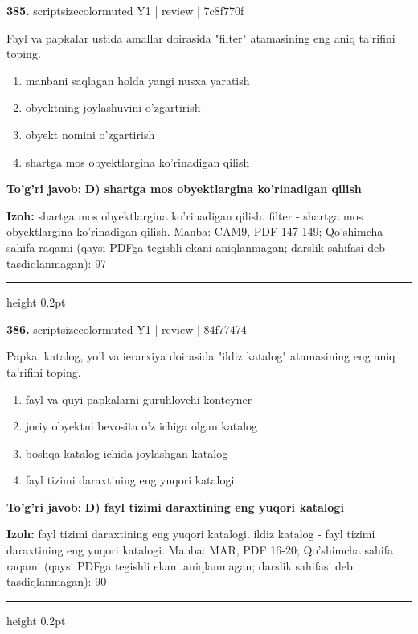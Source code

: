 \documentclass[10pt,a4paper]{article}
\begin{document}
{\bfseries\sffamily\color{ink} 385.} {scriptsizecolor{muted} Y1 | review | 7c8f770f}
\par
Fayl va papkalar ustida amallar doirasida "filter" atamasining eng aniq ta'rifini toping.
\begin{enumerate}[label=\Alph*),leftmargin=9mm]
\item manbani saqlagan holda yangi nusxa yaratish
\item obyektning joylashuvini o'zgartirish
\item obyekt nomini o'zgartirish
\item shartga mos obyektlargina ko'rinadigan qilish
\end{enumerate}
\begin{tcolorbox}[enhanced,breakable,colback=teal!4,colframe=teal!60!black,boxrule=0.45pt,arc=1.2mm,left=2.7mm,right=2.7mm,top=1.8mm,bottom=1.8mm,before skip=2mm,after skip=2mm]
{\bfseries\sffamily\color{teal}To'g'ri javob:} \textbf{D) shartga mos obyektlargina ko'rinadigan qilish}
\par\smallskip
{\bfseries Izoh:} shartga mos obyektlargina ko'rinadigan qilish. filter - shartga mos obyektlargina ko'rinadigan qilish. Manba: CAM9, PDF 147-149; Qo'shimcha sahifa raqami (qaysi PDFga tegishli ekani aniqlanmagan; darslik sahifasi deb tasdiqlanmagan): 97
\end{tcolorbox}
\vspace{2mm}\hrule height 0.2pt\vspace{3mm}

{\bfseries\sffamily\color{ink} 386.} {scriptsizecolor{muted} Y1 | review | 84f77474}
\par
Papka, katalog, yo'l va ierarxiya doirasida "ildiz katalog" atamasining eng aniq ta'rifini toping.
\begin{enumerate}[label=\Alph*),leftmargin=9mm]
\item fayl va quyi papkalarni guruhlovchi konteyner
\item joriy obyektni bevosita o'z ichiga olgan katalog
\item boshqa katalog ichida joylashgan katalog
\item fayl tizimi daraxtining eng yuqori katalogi
\end{enumerate}
\begin{tcolorbox}[enhanced,breakable,colback=teal!4,colframe=teal!60!black,boxrule=0.45pt,arc=1.2mm,left=2.7mm,right=2.7mm,top=1.8mm,bottom=1.8mm,before skip=2mm,after skip=2mm]
{\bfseries\sffamily\color{teal}To'g'ri javob:} \textbf{D) fayl tizimi daraxtining eng yuqori katalogi}
\par\smallskip
{\bfseries Izoh:} fayl tizimi daraxtining eng yuqori katalogi. ildiz katalog - fayl tizimi daraxtining eng yuqori katalogi. Manba: MAR, PDF 16-20; Qo'shimcha sahifa raqami (qaysi PDFga tegishli ekani aniqlanmagan; darslik sahifasi deb tasdiqlanmagan): 90
\end{tcolorbox}
\vspace{2mm}\hrule height 0.2pt\vspace{3mm}
\end{document}
